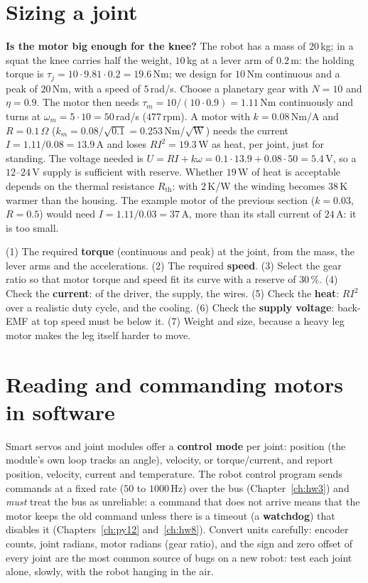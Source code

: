 \section*{Sizing a joint}
\begin{example}
\textbf{Is the motor big enough for the knee?} The robot has a mass of $20$\,kg; in a squat the knee carries half the weight, $10$\,kg at a lever arm of $0.2$\,m: the holding torque is $\tau_j=10\cdot9.81\cdot0.2=19.6$\,Nm; we design for $10$\,Nm continuous and a peak of $20$\,Nm, with a speed of $5$\,rad/s. Choose a planetary gear with $N=10$ and $\eta=0.9$. The motor then needs $\tau_m=10/(10\cdot0.9)=1.11$\,Nm continuously and turns at $\omega_m=5\cdot10=50$\,rad/s ($477$\,rpm). A motor with $k=0.08$\,Nm/A and $R=0.1\,\Omega$ ($k_m=0.08/\sqrt{0.1}=0.253$\,Nm/$\sqrt{\text{W}}$) needs the current $I=1.11/0.08=13.9$\,A and loses $RI^2=19.3$\,W as heat, per joint, just for standing. The voltage needed is $U=RI+k\omega=0.1\cdot13.9+0.08\cdot50=5.4$\,V, so a $12$--$24$\,V supply is sufficient with reserve. Whether $19$\,W of heat is acceptable depends on the thermal resistance $R_\text{th}$: with $2$\,K/W the winding becomes $38$\,K warmer than the housing. The example motor of the previous section ($k=0.03$, $R=0.5$) would need $I=1.11/0.03=37$\,A, more than its stall current of $24$\,A: it is too small.
\end{example}
\begin{keyidea}
(1) The required \textbf{torque} (continuous and peak) at the joint, from the mass, the lever arms and the accelerations. (2) The required \textbf{speed}. (3) Select the gear ratio so that motor torque and speed fit its curve with a reserve of $30$\,\%. (4) Check the \textbf{current}: of the driver, the supply, the wires. (5) Check the \textbf{heat}: $RI^2$ over a realistic duty cycle, and the cooling. (6) Check the \textbf{supply voltage}: back-EMF at top speed must be below it. (7) Weight and size, because a heavy leg motor makes the leg itself harder to move.
\end{keyidea}

\section*{Reading and commanding motors in software}
Smart servos and joint modules offer a \textbf{control mode} per joint: position (the module's own loop tracks an angle), velocity, or torque/current, and report position, velocity, current and temperature. The robot control program sends commands at a fixed rate ($50$ to $1000$\,Hz) over the bus (Chapter~\ref{ch:hw3}) and \emph{must} treat the bus as unreliable: a command that does not arrive means that the motor keeps the old command unless there is a timeout (a \textbf{watchdog}) that disables it (Chapters~\ref{ch:py12} and~\ref{ch:hw8}). Convert units carefully: encoder counts, joint radians, motor radians (gear ratio), and the sign and zero offset of every joint are the most common source of bugs on a new robot: test each joint alone, slowly, with the robot hanging in the air.


